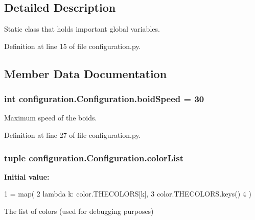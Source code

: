 \subsection{Detailed Description}
Static class that holds important global variables. 

Definition at line 15 of file configuration.\-py.



\subsection{Member Data Documentation}
\hypertarget{classconfiguration_1_1Configuration_a5062047bc933b81cbbaa841e20cb2a67}{
\subsubsection[{boid\-Speed}]{\setlength{\rightskip}{0pt plus 5cm}int configuration.\-Configuration.\-boid\-Speed = 30\hspace{0.3cm}{\ttfamily [static]}}}\label{classconfiguration_1_1Configuration_a5062047bc933b81cbbaa841e20cb2a67}


Maximum speed of the boids. 



Definition at line 27 of file configuration.\-py.

\hypertarget{classconfiguration_1_1Configuration_a2140643801852e373bfddf9945cf26f8}{
\subsubsection[{color\-List}]{\setlength{\rightskip}{0pt plus 5cm}tuple configuration.\-Configuration.\-color\-List\hspace{0.3cm}{\ttfamily [static]}}}\label{classconfiguration_1_1Configuration_a2140643801852e373bfddf9945cf26f8}
{\bfseries Initial value\-:}
\begin{DoxyCode}
1 = map(
2         \textcolor{keyword}{lambda} k: color.THECOLORS[k], 
3         color.THECOLORS.keys()
4     )
\end{DoxyCode}


The list of colors (used for debugging purposes) 



